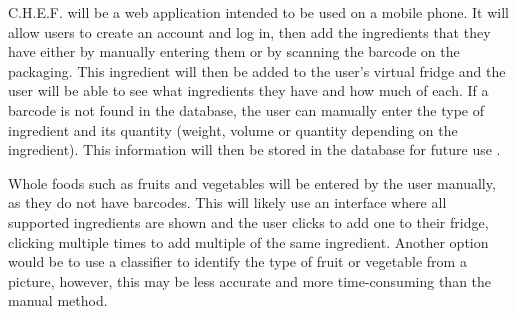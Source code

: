 \documentclass[../CHEFCookingHelperForEveryonesFridge.tex]{subfiles}
\newcommand{\chef}{C.H.E.F.}
\begin{document}
\chef{} will be a web application intended to be used on a mobile phone. It will allow users to create an account and log in,
then add the ingredients that they have either by manually entering them or by scanning the barcode on the packaging.
This ingredient will then be added to the user's virtual fridge and the user will be able to see what ingredients they have and how much of each.
If a barcode is not found in the database, the user can manually enter the type of ingredient and its quantity (weight, volume or quantity depending on the ingredient).
This information will then be stored in the database for future use .

Whole foods such as fruits and vegetables will be entered by the user manually, as they do not have barcodes. This will likely use an interface where
all supported ingredients are shown and the user clicks to add one to their fridge, clicking multiple times to add multiple of the same ingredient.
Another option would be to use a classifier to identify the type of fruit or vegetable from a picture, however, this may be less accurate and more
time-consuming than the manual method.
\end{document}
